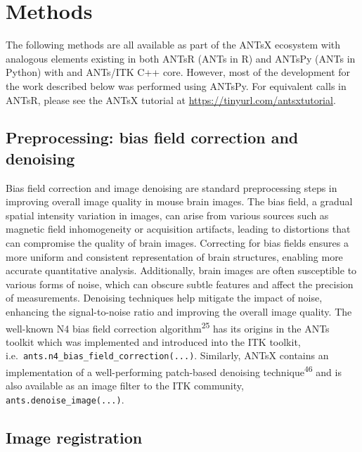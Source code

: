 \documentclass[
  12pt,
]{article}
\begin{document}
\clearpage
\newpage

\hypertarget{methods}{%
\section*{Methods}\label{methods}}

The following methods are all available as part of the ANTsX ecosystem
with analogous elements existing in both ANTsR (ANTs in R) and ANTsPy
(ANTs in Python) with and ANTs/ITK C++ core. However, most of the
development for the work described below was performed using ANTsPy. For
equivalent calls in ANTsR, please see the ANTsX tutorial at
\url{https://tinyurl.com/antsxtutorial}.

\hypertarget{preprocessing-bias-field-correction-and-denoising}{%
\subsection*{Preprocessing: bias field correction and
denoising}\label{preprocessing-bias-field-correction-and-denoising}}

Bias field correction and image denoising are standard preprocessing
steps in improving overall image quality in mouse brain images. The bias
field, a gradual spatial intensity variation in images, can arise from
various sources such as magnetic field inhomogeneity or acquisition
artifacts, leading to distortions that can compromise the quality of
brain images. Correcting for bias fields ensures a more uniform and
consistent representation of brain structures, enabling more accurate
quantitative analysis. Additionally, brain images are often susceptible
to various forms of noise, which can obscure subtle features and affect
the precision of measurements. Denoising techniques help mitigate the
impact of noise, enhancing the signal-to-noise ratio and improving the
overall image quality. The well-known N4 bias field correction
algorithm\textsuperscript{25} has its origins in the ANTs toolkit which
was implemented and introduced into the ITK toolkit,
i.e.~\texttt{ants.n4\_bias\_field\_correction(...)}. Similarly, ANTsX
contains an implementation of a well-performing patch-based denoising
technique\textsuperscript{46} and is also available as an image filter
to the ITK community, \texttt{ants.denoise\_image(...)}.

\hypertarget{image-registration}{%
\subsection*{Image registration}\label{image-registration}}
\end{document}
